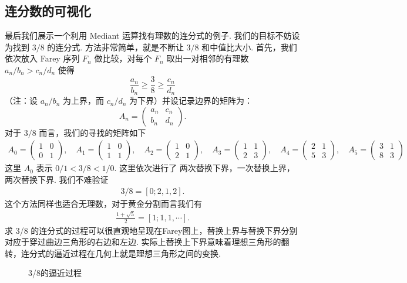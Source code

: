 \documentclass[10pt,UTF8]{ctexart}
\theoremstyle{definition}
\theoremstyle{remark}
\begin{document}
\subsection{连分数的可视化}
最后我们展示一个利用 Mediant 运算找有理数的连分式的例子. 
我们的目标不妨设为找到 $3/8$ 的连分式. 方法非常简单，就是不断让 $3/8$ 和中值比大小. 
首先，我们依次放入 Farey 序列 $F_n$ 做比较，对每个 $F_n$ 取出一对相邻的有理数 $a_n/b_n > c_n/d_n$ 使得 $$\frac{a_n}{b_n} \ge \frac{3}{8} \ge \frac{c_n}{d_n}$$（注：设 $a_n/b_n$ 为上界，而 $c_n/d_n$ 为下界）并设记录边界的矩阵为：
$$A_n = \begin{pmatrix} a_n & c_n \\ b_n & d_n \end{pmatrix}.$$
对于 $3/8$ 而言，我们的寻找的矩阵如下 
\begin{align*}
    A_0= \begin{pmatrix} 1 & 0 \\ 0 & 1 \end{pmatrix},\quad A_1 = \begin{pmatrix} 1 & 0 \\ 1 & 1 \end{pmatrix},\quad A_2 = \begin{pmatrix} 1 & 0 \\ 2 & 1 \end{pmatrix},\quad A_3 = \begin{pmatrix} 1 & 1 \\ 2 & 3 \end{pmatrix}, \quad A_4 = \begin{pmatrix} 2 & 1 \\ 5 & 3 \end{pmatrix}, \quad A_5 = \begin{pmatrix} 3 & 1 \\ 8 & 3 \end{pmatrix} 
\end{align*}
这里 $A_0$ 表示 $0/1<3/8<1/0$. 这里依次进行了 两次替换下界，一次替换上界，两次替换下界. 我们不难验证 
\begin{align*}
    3/8 = [0;2,1,2]. 
\end{align*}
这个方法同样也适合无理数，对于黄金分割而言我们有 
\begin{align*}
    \frac{1+\sqrt{5}}{2} = [1;1,1,\cdots].
\end{align*}
求 3/8 的连分式的过程可以很直观地呈现在Farey图上，替换上界与替换下界分别对应于穿过曲边三角形的右边和左边.
实际上替换上下界意味着理想三角形的翻转，连分式的逼近过程在几何上就是理想三角形之间的变换. 
\begin{figure}[H]
    \centering
    \caption{3/8的逼近过程}
\end{figure}
\end{document}
